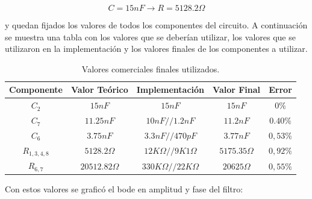 \documentclass[a4paper]{article}
\begin{document}
$$C=15nF \rightarrow R=5128.2\Omega$$

y quedan fijados los valores de todos los componentes del circuito. A continuación se muestra una tabla con los valores que se deberían utilizar, los valores que se utilizaron en la implementación y los valores finales de los componentes a utilizar.

\begin{table}[H]
\centering
\begin{tabular}{@{}ccccc@{}}
\toprule
Componente & Valor Teórico & Implementación & Valor Final & Error \\ \midrule
$C_2$ & $15nF$ & $15nF$ & $15nF$ & $0\%$ \\
$C_7$ & $11.25nF$ & $10nF//1.2nF$ & $11.2nF$ & $0.40\%$ \\
$C_6$ & $3.75nF$ & $3.3nF//470pF$ & $3.77nF$ & $0,53\%$\\
$R_{1,3,4,8}$ & $5128.2 \Omega$ & $12K\Omega//9K1\Omega$ & $5175.35 \Omega$ & $0,92\%$ \\
$R_{6,7}$ & $20512.82 \Omega$ & $330K\Omega//22K\Omega$ & $20625\Omega$ & $0,55\%$ \\ \bottomrule
\end{tabular}
\caption{Valores comerciales finales utilizados.}
\label{Tab:valores}
\end{table}

Con estos valores se graficó el bode en amplitud y fase del filtro:
\end{document}

